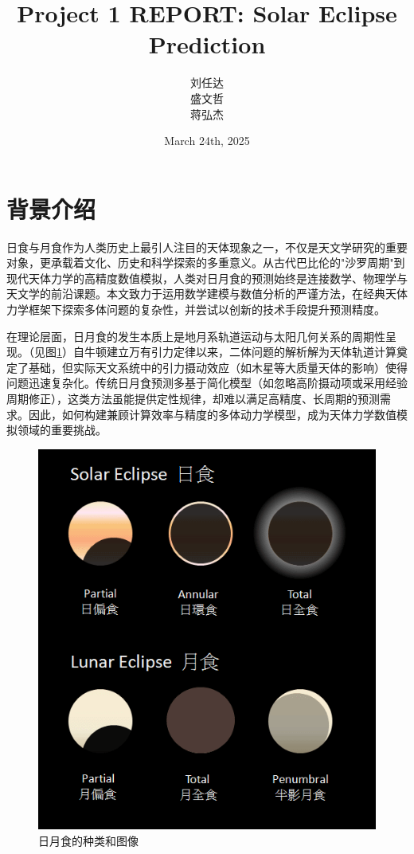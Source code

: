 \documentclass[hidelinks]{article}
\title{\textbf{Project 1 REPORT: Solar Eclipse Prediction}}
\author{刘任达\\盛文哲\\蒋弘杰}
\date{March 24th, 2025}
\begin{document}
\hypersetup{bookmarksnumbered=true,}
\maketitle
\setcounter{tocdepth}{2}
\begin{Large}
\tableofcontents
\end{Large}%
\pagebreak

\section{背景介绍}
日食与月食作为人类历史上最引人注目的天体现象之一，不仅是天文学研究的重要对象，更承载着文化、历史和科学探索的多重意义。从古代巴比伦的"沙罗周期"到现代天体力学的高精度数值模拟，人类对日月食的预测始终是连接数学、物理学与天文学的前沿课题。本文致力于运用数学建模与数值分析的严谨方法，在经典天体力学框架下探索多体问题的复杂性，并尝试以创新的技术手段提升预测精度。

在理论层面，日月食的发生本质上是地月系轨道运动与太阳几何关系的周期性呈现。（见图\ref{fig:eclipse}）自牛顿建立万有引力定律以来，二体问题的解析解为天体轨道计算奠定了基础，但实际天文系统中的引力摄动效应（如木星等大质量天体的影响）使得问题迅速复杂化。传统日月食预测多基于简化模型（如忽略高阶摄动项或采用经验周期修正），这类方法虽能提供定性规律，却难以满足高精度、长周期的预测需求。因此，如何构建兼顾计算效率与精度的多体动力学模型，成为天体力学数值模拟领域的重要挑战。

\begin{figure}[htbp]
    \centering
    \includegraphics[width=0.5\linewidth]{images/ecltype.png}
    \caption{日月食的种类和图像}
    \label{fig:eclipse}
\end{figure}
\end{document}
